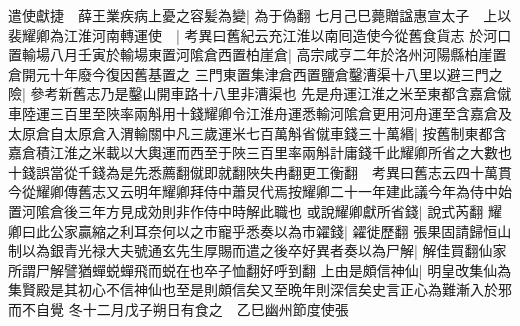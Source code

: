 遣使獻捷　薛王業疾病上憂之容髪為變|{
	為于偽翻}
七月己巳薨贈諡惠宣太子　上以裴耀卿為江淮河南轉運使　|{
	考異曰舊紀云充江淮以南囘造使今從舊食貨志}
於河口置輸場八月壬寅於輸場東置河隂倉西置柏崖倉|{
	高宗咸亨二年於洛州河陽縣柏崖置倉開元十年廢今復因舊基置之}
三門東置集津倉西置鹽倉鑿漕渠十八里以避三門之險|{
	參考新舊志乃是鑿山開車路十八里非漕渠也}
先是舟運江淮之米至東都含嘉倉僦車陸運三百里至陜率兩斛用十錢耀卿令江淮舟運悉輸河隂倉更用河舟運至含嘉倉及太原倉自太原倉入渭輸關中凡三歲運米七百萬斛省僦車錢三十萬緡|{
	按舊制東都含嘉倉積江淮之米載以大輿運而西至于陜三百里率兩斛計庸錢千此耀卿所省之大數也十錢誤當從千錢為是先悉薦翻僦即就翻陜失冉翻更工衡翻　考異曰舊志云四十萬貫今從耀卿傳舊志又云明年耀卿拜侍中蕭炅代焉按耀卿二十一年建此議今年為侍中始置河隂倉後三年方見成効則非作侍中時解此職也}
或說耀卿獻所省錢|{
	說式芮翻}
耀卿曰此公家贏縮之利耳奈何以之市寵乎悉奏以為市糴錢|{
	糴徙歷翻}
張果固請歸恒山制以為銀青光禄大夫號通玄先生厚賜而遣之後卒好異者奏以為尸解|{
	解佳買翻仙家所謂尸解譬猶蟬蜕蟬飛而蜕在也卒子恤翻好呼到翻}
上由是頗信神仙|{
	明皇改集仙為集賢殿是其初心不信神仙也至是則頗信矣又至晩年則深信矣史言正心為難漸入於邪而不自覺}
冬十二月戊子朔日有食之　乙巳幽州節度使張

